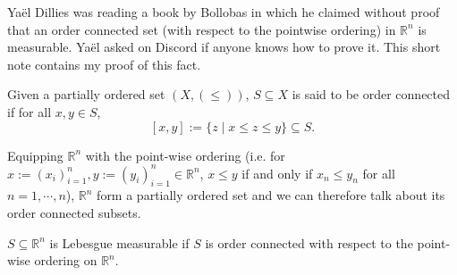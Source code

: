 \documentclass{article}
\begin{document}
Yaël Dillies was reading a book by Bollobas in which he claimed without proof that an order connected set (with respect to the pointwise ordering)
in \(\mathbb{R}^n\) is measurable. Yaël asked on Discord if anyone knows how to prove it. This short note contains my proof of this fact.

\begin{definition}
Given a partially ordered set \((X, (\le))\), \(S \subseteq X\) is said to be order connected if for all \(x, y \in S\),
\[[x, y] := \{z \mid x \le z \le y\} \subseteq S.\]
\end{definition}

Equipping \(\mathbb{R}^n\) with the point-wise ordering (i.e. for
\(x := (x_i)_{i = 1}^n,  y := (y_i)_{i = 1}^n \in \mathbb{R}^n\), \(x \le y\) if and only if
\(x_n \le y_n\) for all \(n = 1, \cdots, n\)), \(\mathbb{R}^n\) form a partially ordered set and we
can therefore talk about its order connected subsets.

\begin{theorem}
\(S \subseteq \mathbb{R}^n\) is Lebesgue measurable if \(S\) is order connected with respect to the
point-wise ordering on \(\mathbb{R}^n\).
\end{theorem}
\end{document}
